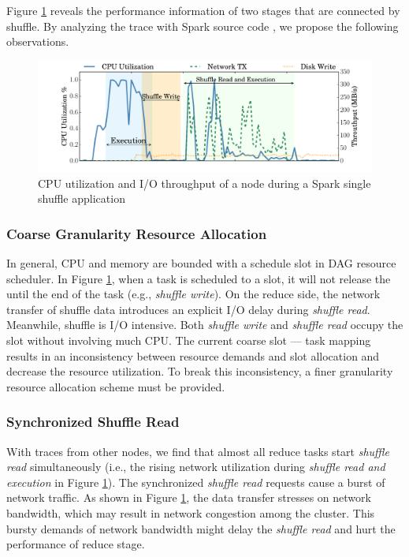 Figure \ref{fig:util} reveals the performance information of two stages that are connected by shuffle. By analyzing the trace with Spark source code \cite{sparksource}, we propose the following observations.

\begin{figure}
	\includegraphics[width=\linewidth]{fig/util}
	\caption{CPU utilization and I/O throughput of a node during a Spark single shuffle application}
	\label{fig:util}
\end{figure}

\subsubsection{Coarse Granularity Resource Allocation}
In general, CPU and memory are bounded with a schedule slot in DAG resource scheduler. In Figure \ref{fig:util}, when a task is scheduled to a slot, it will not release the until the end of the task (e.g., \textit{shuffle write}). On the reduce side, the network transfer of shuffle data introduces an explicit I/O delay during \textit{shuffle read}. Meanwhile, shuffle is I/O intensive. Both \textit{shuffle write} and \textit{shuffle read} occupy the slot without involving much CPU. The current coarse slot --- task mapping results in an inconsistency between resource demands and slot allocation and decrease the resource utilization. To break this inconsistency, a finer granularity resource allocation scheme must be provided.

\subsubsection{Synchronized Shuffle Read}
With traces from other nodes, we find that almost all reduce tasks start \textit{shuffle read} simultaneously (i.e., the rising network utilization during \textit{shuffle read and execution} in Figure \ref{fig:util}). The synchronized \textit{shuffle read} requests cause a burst of network traffic. As shown in Figure \ref{fig:util}, the data transfer stresses on network bandwidth, which may result in network congestion among the cluster. This bursty demands of network bandwidth might delay the \textit{shuffle read} and hurt the performance of reduce stage.

